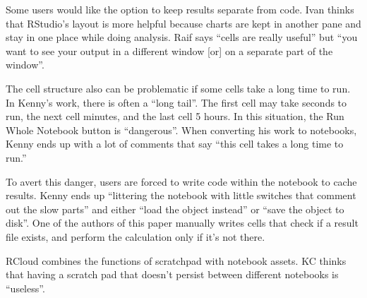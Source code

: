 Some users would like the option to keep results separate from code. 
Ivan thinks that RStudio's layout is more helpful because charts
are kept in another pane and stay in one place while doing analysis. Raif says
``cells are really useful'' but ``you want to see your output in a different
window [or] on a separate part of the window''.

The cell structure also can be problematic if some cells take a long time to
run. In Kenny's work, there is often a ``long tail''.  The first cell may take
seconds to run, the next cell minutes, and the last cell 5 hours.  In this
situation, the Run Whole Notebook button is ``dangerous''. When converting
his work to notebooks, Kenny ends up with a lot of comments that say ``this cell
takes a long time to run.''

To avert this danger, users are forced to write code within the notebook to
cache results. Kenny ends up ``littering the notebook with little switches that
comment out the slow parts'' and either ``load the object instead'' or ``save
the object to disk''. One of the authors of this paper manually writes cells
that check if a result file exists, and perform the calculation only if it's not
there.


RCloud combines the functions of scratchpad with notebook assets. KC thinks
that having a scratch pad that doesn't persist between different notebooks is
``useless''.




